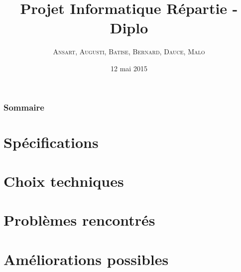 \documentclass[handout]{beamer}
\title{
	Projet Informatique Répartie - Diplo
}
\author{
	\textsc{Ansart}, \textsc{Augusti}, \textsc{Batise},
	\textsc{Bernard}, \textsc{Dauce}, \textsc{Malo}
}
\date{12 mai 2015}
\begin{document}
	\begin{frame}[plain]
		\titlepage
	\end{frame}

	\begin{frame}[plain]
		\frametitle{Sommaire}
		\tableofcontents
	\end{frame}

	\section{Spécifications}
		

	\section{Choix techniques}
		

	\section{Problèmes rencontrés}
		

	\section{Améliorations possibles}
		
\end{document}
